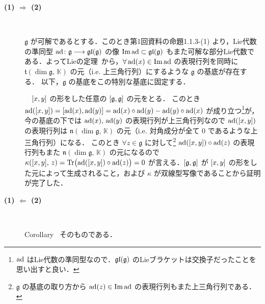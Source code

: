 \documentclass{ltjsarticle}
\makeatletter
\theoremstyle{mystyle} %
\renewcommand{\proofname}{証明}
\renewenvironment{proof}[1][\proofname]{\par
    \pushQED{\qed}%
    \normalfont \topsep6\p@\@plus6\p@\relax
    \trivlist
    \item[\hskip\labelsep
        \itshape
    \textbf{\underline{#1}}]\ignorespaces
}{%
    \popQED\endtrivlist\@endpefalse
}
\numberwithin{equation}{section}
\newcommand{\lto}{\longrightarrow}
\makeatother
\begin{document}
\begin{proof}
    \begin{description}
        \item[\textbf{(1) $\bm{\Longrightarrow}$ (2)}]　
        
        $\mathfrak{g}$ が可解であるとする．このとき第1回資料の命題1.1.3-(1) より，Lie代数の準同型 $\ad \colon \mathfrak{g} \lto \Lgl(\mathfrak{g})$ の像 $\Im \operatorname{ad} \subset \mathfrak{gl}(\mathfrak{g})$ もまた可解な部分Lie代数である．よってLieの定理~\cite[p.16, Corollary A]{Humphreys1972introduction}から，$\forall \operatorname{ad}(x) \in \Im \operatorname{ad}$ の表現行列を同時に $\mathfrak{t}(\dim \mathfrak{g},\, \mathbb{K})$ の元（i.e. 上三角行列）にするような $\mathfrak{g}$ の基底が存在する．
        以下，$\mathfrak{g}$ の基底をこの特別な基底に固定する．
        
        　$\comm{x}{y}$ の形をした任意の $\comm{\mathfrak{g}}{\mathfrak{g}}$ の元をとる．
        このとき $\ad(\comm{x}{y}) = \comm{\ad(x)}{\ad(y)} = \ad(x) \circ \ad(y) - \ad(y) \circ \ad(x)$ が成り立つ\footnote{$\operatorname{ad}$ はLie代数の準同型なので．$\mathfrak{gl} (\mathfrak{g})$ のLieブラケットは交換子だったことを思い出すと良い．}が，今の基底の下では $\operatorname{ad}(x),\, \operatorname{ad}(y)$ の表現行列が上三角行列なので $\ad(\comm{x}{y})$ の表現行列は $\mathfrak{n}(\dim \mathfrak{g},\, \mathbb{K})$ の元（i.e. 対角成分が全て $0$ であるような上三角行列）になる．
        このとき $\forall z \in \mathfrak{g}$ に対して\footnote{$\mathfrak{g}$ の基底の取り方から $\operatorname{ad}(z) \in \Im \operatorname{ad}$ の表現行列もまた上三角行列である．} $\ad(\comm{x}{y}) \circ \ad(z)$ の表現行列もまた $\mathfrak{n}(\dim \mathfrak{g},\, \mathbb{K})$ の元になるので $\kappa(\comm{x}{y},\, z) = \Tr \bigl( \ad(\comm{x}{y}) \circ \ad (z)\bigr) = 0$ が言える．$\comm{\mathfrak{g}}{\mathfrak{g}}$ が $\comm{x}{y}$ の形をした元によって生成されること，および $\kappa$ が双線型写像であることから証明が完了した．
        
        \item[\textbf{(1) $\bm{\Longleftarrow}$ (2)}]　
        
        Corollary~\cite[p.20]{Humphreys1972introduction} そのものである．
    \end{description}
    
\end{proof}




\end{document}
